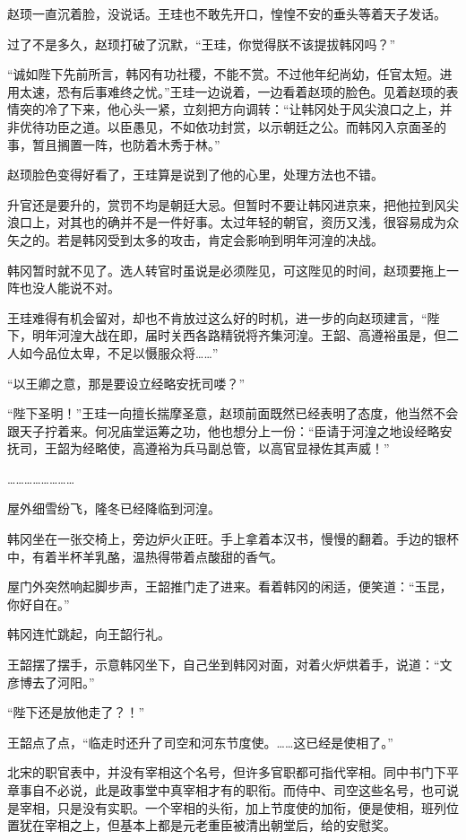 赵顼一直沉着脸，没说话。王珪也不敢先开口，惶惶不安的垂头等着天子发话。

过了不是多久，赵顼打破了沉默，“王珪，你觉得朕不该提拔韩冈吗？”

“诚如陛下先前所言，韩冈有功社稷，不能不赏。不过他年纪尚幼，任官太短。进用太速，恐有后事难终之忧。”王珪一边说着，一边看着赵顼的脸色。见着赵顼的表情突的冷了下来，他心头一紧，立刻把方向调转：“让韩冈处于风尖浪口之上，并非优待功臣之道。以臣愚见，不如依功封赏，以示朝廷之公。而韩冈入京面圣的事，暂且搁置一阵，也防着木秀于林。”

赵顼脸色变得好看了，王珪算是说到了他的心里，处理方法也不错。

升官还是要升的，赏罚不均是朝廷大忌。但暂时不要让韩冈进京来，把他拉到风尖浪口上，对其也的确并不是一件好事。太过年轻的朝官，资历又浅，很容易成为众矢之的。若是韩冈受到太多的攻击，肯定会影响到明年河湟的决战。

韩冈暂时就不见了。选人转官时虽说是必须陛见，可这陛见的时间，赵顼要拖上一阵也没人能说不对。

王珪难得有机会留对，却也不肯放过这么好的时机，进一步的向赵顼建言，“陛下，明年河湟大战在即，届时关西各路精锐将齐集河湟。王韶、高遵裕虽是，但二人如今品位太卑，不足以慑服众将……”

“以王卿之意，那是要设立经略安抚司喽？”

“陛下圣明！”王珪一向擅长揣摩圣意，赵顼前面既然已经表明了态度，他当然不会跟天子拧着来。何况庙堂运筹之功，他也想分上一份：“臣请于河湟之地设经略安抚司，王韶为经略使，高遵裕为兵马副总管，以高官显禄佐其声威！”

……………………

屋外细雪纷飞，隆冬已经降临到河湟。

韩冈坐在一张交椅上，旁边炉火正旺。手上拿着本汉书，慢慢的翻着。手边的银杯中，有着半杯羊乳酪，温热得带着点酸甜的香气。

屋门外突然响起脚步声，王韶推门走了进来。看着韩冈的闲适，便笑道：“玉昆，你好自在。”

韩冈连忙跳起，向王韶行礼。

王韶摆了摆手，示意韩冈坐下，自己坐到韩冈对面，对着火炉烘着手，说道：“文彦博去了河阳。”

“陛下还是放他走了？！”

王韶点了点，“临走时还升了司空和河东节度使。……这已经是使相了。”

北宋的职官表中，并没有宰相这个名号，但许多官职都可指代宰相。同中书门下平章事自不必说，此是政事堂中真宰相才有的职衔。而侍中、司空这些名号，也可说是宰相，只是没有实职。一个宰相的头衔，加上节度使的加衔，便是使相，班列位置犹在宰相之上，但基本上都是元老重臣被清出朝堂后，给的安慰奖。

